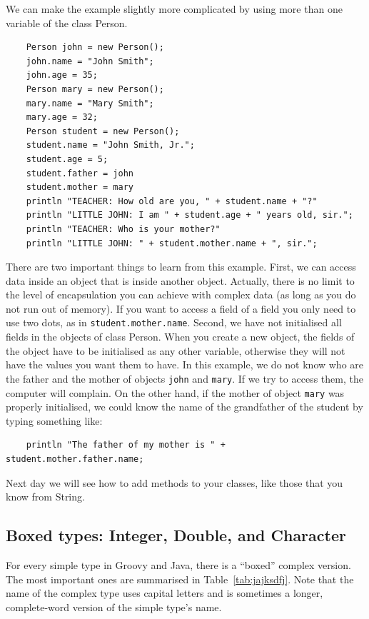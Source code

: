We can make the example slightly more complicated by using more than
one variable of the class Person. 

\begin{verbatim}
    Person john = new Person();
    john.name = "John Smith";
    john.age = 35;
    Person mary = new Person();
    mary.name = "Mary Smith";
    mary.age = 32;
    Person student = new Person();
    student.name = "John Smith, Jr.";
    student.age = 5;
    student.father = john
    student.mother = mary
    println "TEACHER: How old are you, " + student.name + "?"
    println "LITTLE JOHN: I am " + student.age + " years old, sir.";
    println "TEACHER: Who is your mother?"
    println "LITTLE JOHN: " + student.mother.name + ", sir.";
\end{verbatim}

There are two important things to learn from this example. First, we
can access data inside an object that is inside another object. 
Actually, there is no limit to the level of
encapsulation you can achieve with complex data (as long as you do not
run out of memory). If you want to access a field of a field you only
need to use two dots, as in \verb+student.mother.name+. 
Second, we
have not initialised all fields in the objects of class Person. When
you create a new object, the fields of the object have to be
initialised as any other variable, otherwise they will not have the
values you want them to have. In this example, we do not know who are
the father and the mother of objects \verb+john+ and \verb+mary+. If
we try to access them, the computer will complain. On the other hand,
if the mother of object \verb+mary+ was properly initialised, we could
know the name of the grandfather of the student by typing something
like: 

\begin{verbatim}
    println "The father of my mother is " + student.mother.father.name;
\end{verbatim}

Next day we will see how to add methods to your classes,
like those that you know from String. 

\subsection{Boxed types: Integer, Double, and Character}
\label{sec:boxed-types:-integer}

For every simple type in Groovy and Java, there is a ``boxed'' complex
version. The most important ones are summarised in
Table~\ref{tab:jajksdfj}. 
Note that the name of the complex type uses capital letters and is
sometimes a longer, complete-word version of the simple type's name. 

